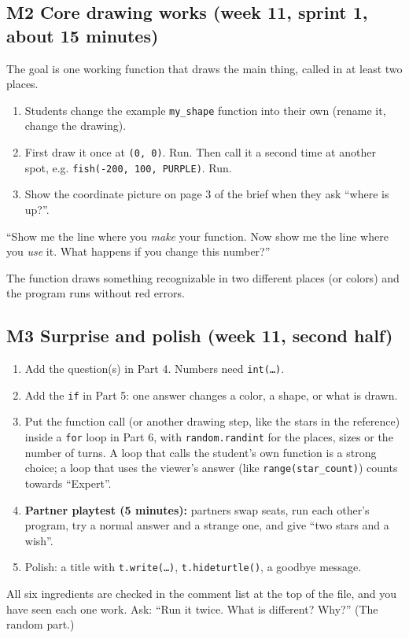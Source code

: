 \documentclass[level=1,teacher]{kidscode}
\begin{document}
\subsection{M2 Core drawing works (week 11, sprint 1, about 15 minutes)}
The goal is one working function that draws the main thing, called in at least two places.
\begin{enumerate}[itemsep=2pt]
  \item Students change the example \texttt{my\_shape} function into their own (rename it, change the drawing).
  \item First draw it once at \texttt{(0, 0)}. Run. Then call it a second time at another spot,
        e.g. \texttt{fish(-200, 100, PURPLE)}. Run.
  \item Show the coordinate picture on page 3 of the brief when they ask \enquote{where is up?}.
\end{enumerate}
\begin{teacherscript}
\enquote{Show me the line where you \emph{make} your function. Now show me the line where you
\emph{use} it. What happens if you change this number?}
\end{teacherscript}
\begin{formativecheck}
The function draws something recognizable in two different places (or colors) and the program runs
without red errors.
\end{formativecheck}

\subsection{M3 Surprise and polish (week 11, second half)}
\begin{enumerate}[itemsep=2pt]
  \item Add the question(s) in Part 4. Numbers need \texttt{int(\dots)}.
  \item Add the \texttt{if} in Part 5: one answer changes a color, a shape, or what is drawn.
  \item Put the function call (or another drawing step, like the stars in the reference) inside a
        \texttt{for} loop in Part 6, with \texttt{random.randint} for the places, sizes or the number of turns.
        A loop that calls the student's own function is a strong choice; a loop that uses the viewer's answer (like \texttt{range(star\_count)}) counts towards \enquote{Expert}.
  \item \textbf{Partner playtest (5 minutes):} partners swap seats, run each other's program, try a
        normal answer and a strange one, and give \enquote{two stars and a wish}.
  \item Polish: a title with \texttt{t.write(\dots)}, \texttt{t.hideturtle()}, a goodbye message.
\end{enumerate}
\begin{formativecheck}
All six ingredients are checked in the comment list at the top of the file, and you have seen each one
work. Ask: \enquote{Run it twice. What is different? Why?} (The random part.)
\end{formativecheck}
\end{document}
